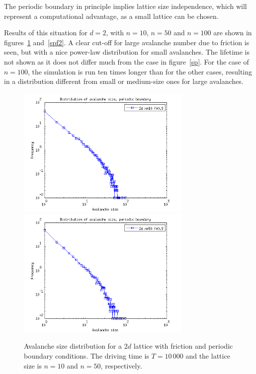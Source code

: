 The periodic boundary in principle implies lattice size independence, which will represent a computational advantage, as a small lattice can be chosen.

Results of this situation for $d=2$, with $n=10$, $n=50$ and $n=100$ are shown in figures~\ref{spf1} and~\ref{spf2}. A clear cut-off for large avalanche number due to friction is seen, but with a nice power-law distribution for small avalanches. The lifetime is not shown as it does not differ much from the case in figure~\ref{sp}. For the case of $n=100$, the simulation is run ten times longer than for the other cases, resulting in a distribution different from small or medium-size ones for large avalanches.


\begin{figure} 
\begin{center}
\includegraphics[width=0.75\textwidth]{results/spf.png}
\includegraphics[width=0.75\textwidth]{results/spf50.png} \\
\caption{Avalanche size distribution for a $2d$ lattice with friction and periodic boundary conditions. The driving time is $T=10\,000$ and the lattice size is $n=10$ and $n=50$, respectively. }
\label{spf1}
\end{center}
\end{figure}


